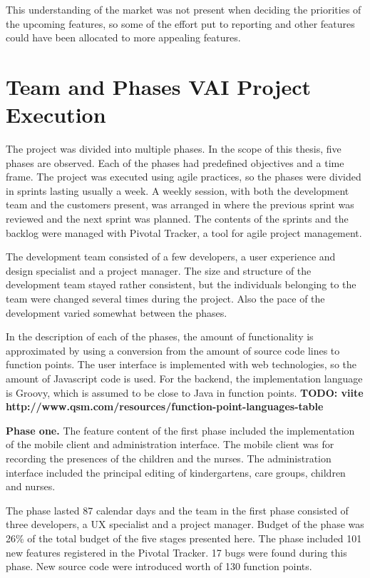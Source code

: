 This understanding of the market was not present when deciding the priorities of the upcoming features, so some of the effort put to reporting and other features could have been allocated to more appealing features.

 \section{Team and Phases VAI Project Execution}

The project was divided into multiple phases. In the scope of this thesis, five phases are observed. Each of the phases had predefined objectives and a time frame. The project was executed using agile practices, so the phases were divided in sprints lasting usually a week. A weekly session, with both the development team and the customers present, was arranged in where the previous sprint was reviewed and the next sprint was planned. The contents of the sprints and the backlog were managed with Pivotal Tracker, a tool for agile project management.

The development team consisted of a few developers, a user experience and design specialist and a project manager. The size and structure of the development team stayed rather consistent, but the individuals belonging to the team were changed several times during the project. Also the pace of the development varied somewhat between the phases.

In the description of each of the phases, the amount of functionality is approximated by using a conversion from the amount of source code lines to function points. The user interface is implemented with web technologies, so the amount of Javascript code is used. For the backend, the implementation language is Groovy, which is assumed to be close to Java in function points. \textbf{TODO: viite http://www.qsm.com/resources/function-point-languages-table}

\textbf{Phase one.} The feature content of the first phase included the implementation of the mobile client and administration interface. The mobile client was for recording the presences of the children and the nurses. The administration interface included the principal editing of kindergartens, care groups, children and nurses.

The phase lasted 87 calendar days and the team in the first phase consisted of three developers, a UX specialist and a project manager. Budget of the phase was 26\% of the total budget of the five stages presented here. The phase included 101 new features registered in the Pivotal Tracker. 17 bugs were found during this phase. New source code were introduced worth of 130 function points.

